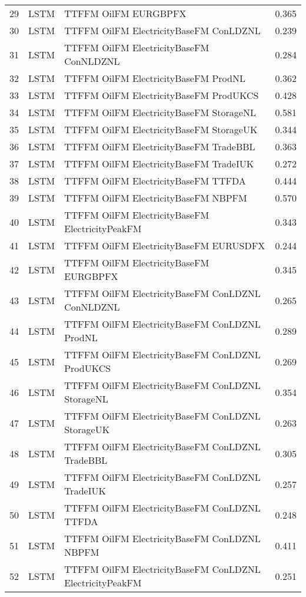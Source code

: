 \begin{table}[ht]
\begin{tabular}{rllr}
  29 & LSTM & TTFFM OilFM EURGBPFX & 0.365 \\ 
  30 & LSTM & TTFFM OilFM ElectricityBaseFM ConLDZNL & 0.239 \\ 
  31 & LSTM & TTFFM OilFM ElectricityBaseFM ConNLDZNL & 0.284 \\ 
  32 & LSTM & TTFFM OilFM ElectricityBaseFM ProdNL & 0.362 \\ 
  33 & LSTM & TTFFM OilFM ElectricityBaseFM ProdUKCS & 0.428 \\ 
  34 & LSTM & TTFFM OilFM ElectricityBaseFM StorageNL & 0.581 \\ 
  35 & LSTM & TTFFM OilFM ElectricityBaseFM StorageUK & 0.344 \\ 
  36 & LSTM & TTFFM OilFM ElectricityBaseFM TradeBBL & 0.363 \\ 
  37 & LSTM & TTFFM OilFM ElectricityBaseFM TradeIUK & 0.272 \\ 
  38 & LSTM & TTFFM OilFM ElectricityBaseFM TTFDA & 0.444 \\ 
  39 & LSTM & TTFFM OilFM ElectricityBaseFM NBPFM & 0.570 \\ 
  40 & LSTM & TTFFM OilFM ElectricityBaseFM ElectricityPeakFM & 0.343 \\ 
  41 & LSTM & TTFFM OilFM ElectricityBaseFM EURUSDFX & 0.244 \\ 
  42 & LSTM & TTFFM OilFM ElectricityBaseFM EURGBPFX & 0.345 \\ 
  43 & LSTM & TTFFM OilFM ElectricityBaseFM ConLDZNL ConNLDZNL & 0.265 \\ 
  44 & LSTM & TTFFM OilFM ElectricityBaseFM ConLDZNL ProdNL & 0.289 \\ 
  45 & LSTM & TTFFM OilFM ElectricityBaseFM ConLDZNL ProdUKCS & 0.269 \\ 
  46 & LSTM & TTFFM OilFM ElectricityBaseFM ConLDZNL StorageNL & 0.354 \\ 
  47 & LSTM & TTFFM OilFM ElectricityBaseFM ConLDZNL StorageUK & 0.263 \\ 
  48 & LSTM & TTFFM OilFM ElectricityBaseFM ConLDZNL TradeBBL & 0.305 \\ 
  49 & LSTM & TTFFM OilFM ElectricityBaseFM ConLDZNL TradeIUK & 0.257 \\ 
  50 & LSTM & TTFFM OilFM ElectricityBaseFM ConLDZNL TTFDA & 0.248 \\ 
  51 & LSTM & TTFFM OilFM ElectricityBaseFM ConLDZNL NBPFM & 0.411 \\ 
  52 & LSTM & TTFFM OilFM ElectricityBaseFM ConLDZNL ElectricityPeakFM & 0.251 \\ 

\end{tabular}
\end{table}
